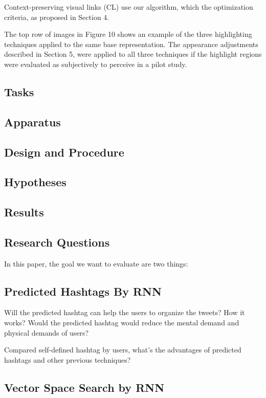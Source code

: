 Context-preserving visual links (CL) use our algorithm, which  the optimization criteria, as proposed in Section 4.

The top row of images in Figure 10 shows an example of the three highlighting techniques applied to the same base representation. The appearance adjustments described in Section 5, were applied to all three techniques if the highlight regions were evaluated as subjectively to perceive in a pilot study.

\subsection{Tasks}

\subsection{Apparatus}

\subsection{Design and Procedure}

\subsection{Hypotheses}

\subsection{Results}


\subsection{Research Questions}

In this paper, the goal we want to evaluate are two things:

\subsection{Predicted Hashtags By RNN}

Will the predicted hashtag can help the users to organize the tweets? How it works? Would the predicted hashtag would reduce the mental demand and physical demands of users?

Compared self-defined hashtag by users, what's the advantages of predicted hashtags and other previous techniques?


\subsection{Vector Space Search by RNN}


